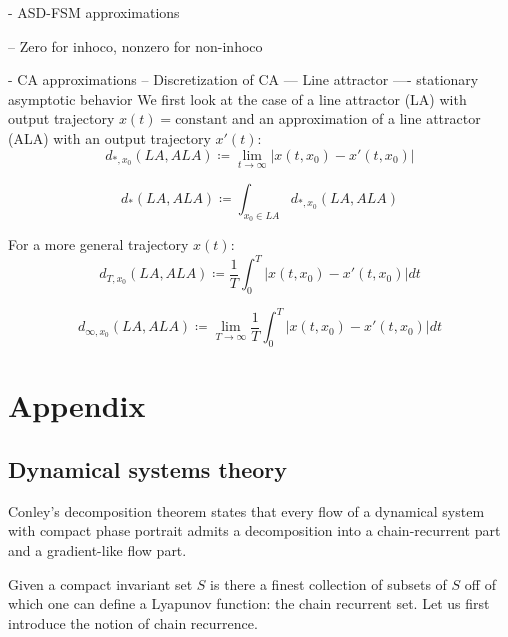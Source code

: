\documentclass{scrartcl}
\theoremstyle{definition}
\theoremstyle{remark}
\begin{document}
- ASD-FSM approximations

-- Zero for inhoco, nonzero for non-inhoco




- CA approximations 
-- Discretization of CA
--- Line attractor
---- stationary asymptotic behavior
We first look at the case of a line attractor (LA) with output trajectory $x(t)=\text{constant}$ and an approximation of a line attractor (ALA) with an output trajectory $x'(t)$:
\begin{equation}
d_{*,x_0}(LA, ALA) \coloneqq\lim_{t\rightarrow\infty} |x(t, x_0) - x'(t, x_0)|
\end{equation}

\begin{equation}
d_{*}(LA, ALA) \coloneqq \int_{x_0\in LA} d_{*,x_0}(LA, ALA)
\end{equation}



For a more general trajectory $x(t)$:
\begin{equation}
d_{T,x_0}(LA, ALA) \coloneqq \frac{1}{T} \int_0^T   |x(t, x_0) - x'(t, x_0)| dt
\end{equation}

\begin{equation}
d_{\infty,x_0}(LA, ALA) \coloneqq \lim_{T\rightarrow\infty} \frac{1}{T} \int_0^T   |x(t, x_0) - x'(t, x_0)| dt
\end{equation}


 \newpage
 
 



\newpage
\section{Appendix}
\subsection{Dynamical systems theory}\label{sec:dst}

Conley's decomposition theorem states that every flow of a dynamical system with compact phase portrait admits a decomposition into a chain-recurrent part and a gradient-like flow part.


Given a compact invariant set $S$ is there a finest collection of subsets of $S$ off of which one can define a Lyapunov function: the chain recurrent set. Let us first introduce the notion of chain recurrence.
\end{document}
